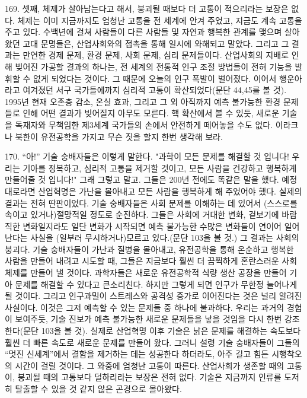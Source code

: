 \documentclass[11pt,a4paper]{article}
\begin{document}
\begin{multicols}{2}
169. 셋째, 체제가 살아남는다고 해서, 붕괴될 때보다 더 고통이 적으리라는 보장은 없다. 체제는 이미  지금까지도 엄청난 고통을 전 세계에 안겨 주었고, 지금도 계속 고통을 주고 있다. 수백년에 걸쳐  사람들이 다른 사람들 및 자연과 행복한 관계를 맺으며 살아왔던 고대 문명들은, 산업사회와의 접촉을  통해 일시에 와해되고 말았다. 그리고 그 결과는 만연한 경제 문제, 환경 문제, 사회 문제, 심리  문제들이다. 산업사회의 지배로 인해 빚어진 가공할 결과의 하나는, 전 세계의 전통적 인구 조절 방법들이 전혀 기능을 발휘할 수 없게 되었다는 것이다. 그 때문에 오늘의 인구 폭발이 벌어졌다. 이어서  행운아라고 여겨졌던 서구 국가들에까지 심리적 고통이 확산되었다(문단 44,45를 볼 것). 1995년 현재  오존층 감소, 온실 효과, 그리고 그 외 아직까지 예측 불가능한 환경 문제들로 인해 어떤 결과가 빚어질지  아무도 모른다. 핵 확산에서 볼 수 있듯, 새로운 기술을 독재자와 무책임한 제3세계 국가들의 손에서  안전하게 떼어놓을 수도 없다. 이라크나 북한이 유전공학을 가지고 무슨 짓을 할지 한번 생각해 보라.  


170. “아!” 기술 숭배자들은 이렇게 말한다. "과학이 모든 문제를 해결할 것 입니다! 우리는 기아를 정복하고, 심리적 고통을 제거할 것이고, 모든 사람을 건강하고 행복하게 만들어줄 것 입니다!" 그래 그렇고  말고. 그들은 200년 전에도 똑같은 말을 했다. 예정대로라면 산업혁명은 가난을 몰아내고 모든 사람을  행복하게 해 주었어야 했다. 실제의 결과는 전혀 딴판이었다. 기술 숭배자들은 사회 문제를 이해하는 데  있어서 (스스로를 속이고 있거나)절망적일 정도로 순진하다. 그들은 사회에 거대한 변화, 겉보기에  바람직한 변화일지라도 일단 변화가 시작되면 예측 불가능한 수많은 변화들이 연이어 일어난다는 사실을  (일부러 무시하거나)모르고 있다.(문단 103을 볼 것.) 그 결과는 사회의 붕괴다. 기술 숭배자들이 가난과  질병을 몰아내고, 유전공학을 통해 온순하고 행복한 사람을 만들어 내려고 시도할 때, 그들은 지금보다  훨씬 더 끔찍하게 혼란스러운 사회 체제를 만들어 낼 것이다. 과학자들은 새로운 유전공학적 식량 생산  공장을 만들어 기아 문제를 해결할 수 있다고 큰소리친다. 하지만 그렇게 되면 인구가 무한정 늘어나게 될 것이다. 그리고 인구과밀이 스트레스와 공격성 증가로 이어진다는 것은 널리 알려진 사실이다. 이것은  그저 예측할 수 있는 문제들 중 하나에 불과하다. 우리는 과거의 경험이 보여주듯, 기술 진보가 예측  불가능한 새로운 문제들을 낳을 것임을 다시 한번 강조한다(문단 103을 볼 것). 실제로 산업혁명 이후 기술은 낡은 문제를 해결하는 속도보다 훨씬 더 빠른 속도로 새로운 문제를 만들어 왔다. 그러니 설령 기술 숭배자들이 그들의 “멋진 신세계”에서 결함을 제거하는 데는 성공한다 하더라도, 아주 길고 힘든 시행착오의 시간이 걸릴 것이다. 그 와중에 엄청난 고통이 따른다. 산업사회가 생존할 때의 고통이, 붕괴될 때의 고통보다 덜하리라는 보장은 전혀 없다. 기술은 지금까지 인류를 도저히 탈출할 수 있을 것  같지 않은 곤경으로 몰아왔다.  



\end{multicols}
\end{document}
